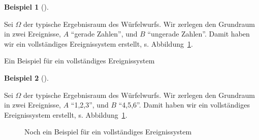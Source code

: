 \documentclass[
  ngerman,
  letterpaper,
  twoside,
  open=any]{scrbook}
\theoremstyle{definition}
\newtheorem{example}{Beispiel}[chapter]
\theoremstyle{plain}
\theoremstyle{definition}
\theoremstyle{definition}
\theoremstyle{definition}
\newtheorem{example}{Beispiel}[chapter]
\theoremstyle{definition}
\theoremstyle{remark}
\begin{document}
\begin{example}[]\protect\hypertarget{exm-vollereig1}{}\label{exm-vollereig1}

Sei \(\Omega\) der typische Ergebnisraum des Würfelwurfs. Wir zerlegen
den Grundraum in zwei Ereignisse, \(A\) \enquote{gerade Zahlen}, und
\(B\) \enquote{ungerade Zahlen}. Damit haben wir ein vollständiges
Ereignissystem erstellt, s. Abbildung~\ref{fig-complete-event-system1}.

\begin{figure}[H]


\caption{\label{fig-complete-event-system1}}

\end{figure}%

Ein Beispiel für ein vollständiges Ereignissystem

\end{example}

\begin{example}[]\protect\hypertarget{exm-vollereig2}{}\label{exm-vollereig2}

Sei \(\Omega\) der typische Ergebnisraum des Würfelwurfs. Wir zerlegen
den Grundraum in zwei Ereignisse, \(A\) \enquote{1,2,3}, und \(B\)
\enquote{4,5,6}. Damit haben wir ein vollständiges Ereignissystem
erstellt, s. Abbildung~\ref{fig-complete-event-system1}.

\begin{figure}[H]


\caption{\label{fig-fig-complete-event-system2}Noch ein Beispiel für ein
vollständiges Ereignissystem}

\end{figure}%

\end{example}
\end{document}
